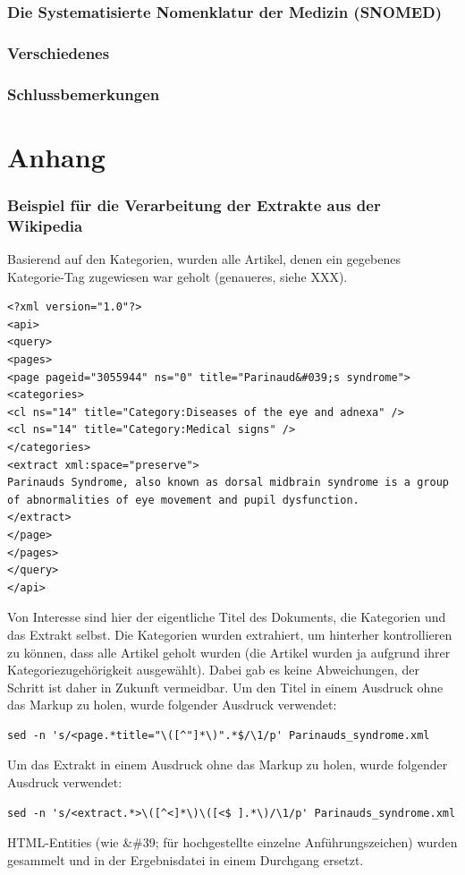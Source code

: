 \documentclass[pagesize,DIV=calc,12pt,draft]{scrreprt}
\begin{document}
\subsection{Die Systematisierte Nomenklatur der Medizin (SNOMED)}

\subsection{Verschiedenes}

\subsection{Schlussbemerkungen}

\chapter{Anhang}

\subsection{Beispiel für die Verarbeitung der Extrakte aus der Wikipedia}

Basierend auf den Kategorien, wurden alle Artikel, denen ein gegebenes Kategorie-Tag zugewiesen war geholt (genaueres, siehe XXX).

\lstset{
language=XML
}

\begin{lstlisting}
<?xml version="1.0"?>
<api>
<query>
<pages>
<page pageid="3055944" ns="0" title="Parinaud&#039;s syndrome">
<categories>
<cl ns="14" title="Category:Diseases of the eye and adnexa" />
<cl ns="14" title="Category:Medical signs" />
</categories>
<extract xml:space="preserve">
Parinauds Syndrome, also known as dorsal midbrain syndrome is a group of abnormalities of eye movement and pupil dysfunction.
</extract>
</page>
</pages>
</query>
</api>
\end{lstlisting}

Von Interesse sind hier der eigentliche Titel des Dokuments, die Kategorien und das Extrakt selbst. 
Die Kategorien wurden extrahiert, um hinterher kontrollieren zu können, dass alle Artikel geholt wurden (die Artikel wurden ja aufgrund ihrer Kategoriezugehörigkeit ausgewählt). 
Dabei gab es keine Abweichungen, der Schritt ist daher in Zukunft vermeidbar. 
Um den Titel in einem Ausdruck ohne das Markup zu holen, wurde folgender Ausdruck verwendet: 

\lstset{
language=bash
}

\begin{lstlisting}
sed -n 's/<page.*title="\([^"]*\)".*$/\1/p' Parinauds_syndrome.xml
\end{lstlisting}

Um das Extrakt in einem Ausdruck ohne das Markup zu holen, wurde
folgender Ausdruck verwendet:

\begin{lstlisting}
sed -n 's/<extract.*>\([^<]*\)\([<$ ].*\)/\1/p' Parinauds_syndrome.xml
\end{lstlisting}

HTML-Entities (wie \&\#39; für hochgestellte einzelne Anführungszeichen) wurden gesammelt und in der Ergebnisdatei in einem Durchgang ersetzt.
\end{document}
